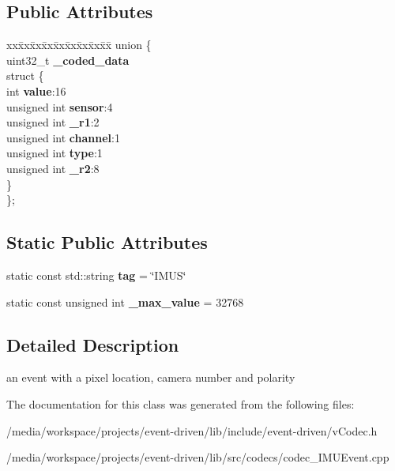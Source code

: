 \subsection*{Public Attributes}
\begin{DoxyCompactItemize}
\item 
\mbox{\label{classev_1_1IMUevent_afb248b213266090a435ff4880b73f0de}} 
\begin{tabbing}
xx\=xx\=xx\=xx\=xx\=xx\=xx\=xx\=xx\=\kill
union \{\\
\>uint32\_t {\bfseries \_coded\_data}\\
\mbox{\label{unionev_1_1IMUevent_1_1_0D17_a89bbdc2184dc700fff35e8caeead3527}} 
\>struct \{\\
\>\>int {\bfseries value}:16\\
\>\>unsigned int {\bfseries sensor}:4\\
\>\>unsigned int {\bfseries \_r1}:2\\
\>\>unsigned int {\bfseries channel}:1\\
\>\>unsigned int {\bfseries type}:1\\
\>\>unsigned int {\bfseries \_r2}:8\\
\>\} \\
\}; \\

\end{tabbing}\end{DoxyCompactItemize}
\subsection*{Static Public Attributes}
\begin{DoxyCompactItemize}
\item 
\mbox{\label{classev_1_1IMUevent_a12ea90ffb6df46ef808eeed4df65fdf1}} 
static const std\+::string {\bfseries tag} = \char`\"{}I\+M\+US\char`\"{}
\item 
\mbox{\label{classev_1_1IMUevent_a95583a57a83bd5fb5363d9ee7085a050}} 
static const unsigned int {\bfseries \+\_\+max\+\_\+value} = 32768
\end{DoxyCompactItemize}


\subsection{Detailed Description}
an event with a pixel location, camera number and polarity 

The documentation for this class was generated from the following files\+:\begin{DoxyCompactItemize}
\item 
/media/workspace/projects/event-\/driven/lib/include/event-\/driven/v\+Codec.\+h\item 
/media/workspace/projects/event-\/driven/lib/src/codecs/codec\+\_\+\+I\+M\+U\+Event.\+cpp\end{DoxyCompactItemize}
